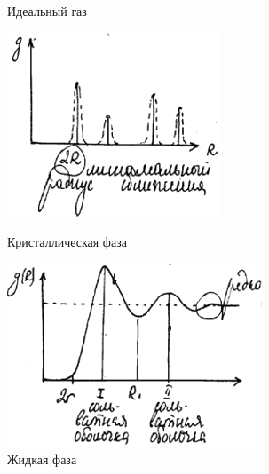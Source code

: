 \begin{lecture}
\begin{lecSection}[Введение]
\begin{figure}[h]
\begin{minipage}{0.35\linewidth}
			\caption{Идеальный газ}
		\end{minipage}
		\begin{minipage}{0.28\linewidth}
			\centering\includegraphics[width=\linewidth]{lecture_12/new_id_gas2}
			\caption{Кристаллическая фаза}
		\end{minipage}
		\begin{minipage}{0.35\linewidth}
			\centering\includegraphics[width=\linewidth]{lecture_12/new_id_gas3}
			\caption{Жидкая фаза}
			\label{fig:12:liq_scheme}
		\end{minipage}
	\end{figure}


\end{lecSection}
\end{lecture}
